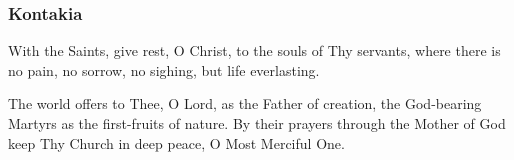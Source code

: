 \subsubsection{Kontakia}

With the Saints, give rest, O Christ, to the souls of Thy servants, where there is no pain, no sorrow, no sighing, but life everlasting.

The world offers to Thee, O Lord, as the Father of creation, the God-bearing Martyrs as the first-fruits of nature. By their prayers through the Mother of God keep Thy Church in deep peace, O Most Merciful One.
